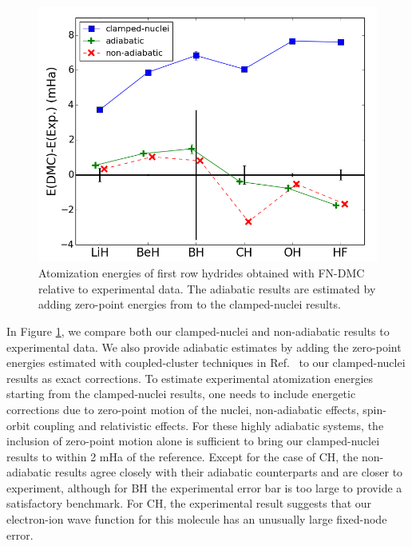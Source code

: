 \documentclass[pra,superscriptaddress,groupedaddress,twocolumn]{revtex4}
\begin{document}
\begin{figure}[h]
\centering
\includegraphics[scale=.4]{Figures/atomization}
\caption{Atomization energies of first row hydrides obtained with FN-DMC relative to experimental data. The adiabatic results are estimated by adding zero-point energies from \cite{Feller_Corrections} to the clamped-nuclei results. \label{fig:atomization}}
\end{figure}

In Figure \ref{fig:atomization}, we compare both our clamped-nuclei and non-adiabatic results to experimental data. We also provide adiabatic estimates by adding the zero-point energies estimated with coupled-cluster techniques in Ref.~\cite{Feller_Corrections} to our clamped-nuclei results as exact corrections. To estimate experimental atomization energies starting from the clamped-nuclei results, one needs to include energetic corrections due to zero-point motion of the nuclei, non-adiabatic effects, spin-orbit coupling and relativistic effects. For these highly adiabatic systems, the inclusion of zero-point motion alone is sufficient to bring our clamped-nuclei results to within 2 mHa of the reference. Except for the case of CH, the non-adiabatic results agree closely with their adiabatic counterparts and are closer to experiment, although for BH the experimental error bar is too large to provide a satisfactory benchmark. For CH, the experimental result suggests that our electron-ion wave function for this molecule has an unusually large fixed-node error.
\end{document}
